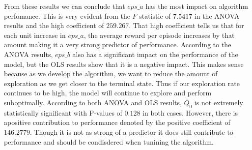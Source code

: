\documentclass{article}
\begin{document}
From these results we can conclude that $eps\_a$ has the most impact on algorithm perfomance. This is very evident from the $F$ statistic of $7.5417$ in the ANOVA results and the high coefficient of $259.267$. That high coefficient tells us that for each unit increase in $eps\_a$, the average reward per episode increases by that amount making it a very strong predictor of performance. 
\newline
According to the ANOVA results, $eps\_b$ also has a significant impact on the performance of the model, but the OLS results show that it is a negative impact. This makes sense because as we develop the algorithm, we want to reduce the amount of exploration as we get closer to the terminal state. Thus if our exploration rate continues to be high, the model will continue to explore and perform suboptimally. 
\newline
According to both ANOVA and OLS results, $\bar{Q}_0$ is not extremely statistically significant with P-values of $0.128$ in both cases. However, there is apositive contribution to performance denoted by the positive coefficient of $146.2779$. Though it is not as strong of a predictor it does still contribute to performance and should be condisdered when tunining the algorithm. 
\end{document}
